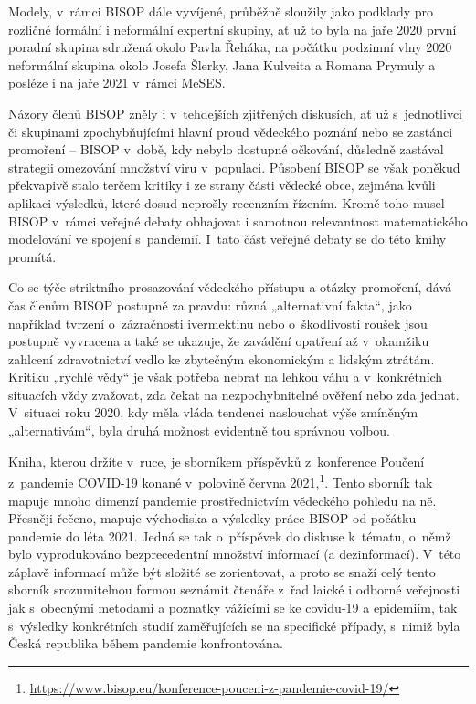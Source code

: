  Modely, v~rámci BISOP dále vyvíjené, průběžně sloužily jako podklady pro rozličné formální i neformální expertní skupiny, ať už to byla na jaře 2020 první poradní skupina sdružená okolo Pavla Řeháka, na počátku podzimní vlny 2020 neformální skupina okolo Josefa Šlerky, Jana Kulveita a Romana Prymuly a posléze i na jaře 2021 v~rámci MeSES.

 Názory členů BISOP zněly i v~tehdejších zjitřených diskusích, ať už s~jednotlivci či skupinami zpochybňujícími hlavní proud vědeckého poznání nebo se zastánci promoření -- BISOP v~době, kdy nebylo dostupné očkování, důsledně zastával strategii omezování množství viru v~populaci. Působení BISOP se však poněkud překvapivě stalo terčem kritiky i ze strany části vědecké obce, zejména kvůli aplikaci výsledků, které dosud neprošly recenzním řízením. Kromě toho musel BISOP v~rámci veřejné debaty obhajovat i samotnou relevantnost matematického modelování ve spojení s~pandemií. I~tato část veřejné debaty se do této knihy promítá.

 Co se týče striktního prosazování vědeckého přístupu a otázky promoření, dává čas členům BISOP postupně za pravdu: různá „alternativní fakta“, jako například tvrzení o~zázračnosti ivermektinu nebo o~škodlivosti roušek jsou postupně vyvracena a také se ukazuje, že zavádění opatření až v~okamžiku zahlcení zdravotnictví vedlo ke zbytečným ekonomickým a lidským ztrátám. Kritiku „rychlé vědy“ je však potřeba nebrat na lehkou váhu a v~konkrétních situacích vždy zvažovat, zda čekat na nezpochybnitelné ověření nebo zda jednat. V~situaci roku 2020, kdy měla vláda tendenci naslouchat výše zmíněným „alternativám“, byla druhá možnost evidentně tou správnou volbou.


 Kniha, kterou držíte v~ruce, je sborníkem příspěvků z~konference Poučení z~pandemie COVID-19 konané v~polovině června 2021,\footnote{\url{https://www.bisop.eu/konference-pouceni-z-pandemie-covid-19/}}. Tento sborník tak mapuje mnoho dimenzí pandemie prostřednictvím vědeckého pohledu na ně. Přesněji řečeno, mapuje východiska a výsledky práce BISOP od počátku pandemie do léta 2021. Jedná se tak o~příspěvek do diskuse k~tématu, o~němž bylo vyprodukováno bezprecedentní množství informací (a dezinformací). V~této záplavě informací může být složité se zorientovat, a proto se snaží celý tento sborník srozumitelnou formou seznámit čtenáře z~řad laické i odborné veřejnosti jak s~obecnými metodami a poznatky vážícími se ke covidu-19 a epidemiím, tak s~výsledky konkrétních studií zaměřujících se na specifické případy, s~nimiž byla Česká republika během pandemie konfrontována.



